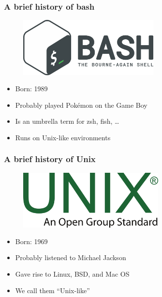 \documentclass[aspectratio=169]{beamer}
\begin{document}
\begin{frame}
  \frametitle{A brief history of bash}
  \begin{figure}[h]
    \centering
    \includegraphics[height=3cm]{./assets/bash_logo.png}
  \end{figure}
  \begin{itemize}
    \item Born: 1989
    \item Probably played Pokémon on the Game Boy
    \item Is an umbrella term for zsh, fish, …
    \item Runs on Unix-like environments
  \end{itemize}
\end{frame}

\begin{frame}
  \frametitle{A brief history of Unix}
  \begin{figure}[h]
    \centering
    \includegraphics[height=3cm]{./assets/unix_logo.png}
  \end{figure}
  \begin{itemize}
    \item Born: 1969
    \item Probably listened to Michael Jackson
    \item Gave rise to Linux, BSD, and Mac OS
    \item We call them ``Unix-like''
  \end{itemize}
\end{frame}
\end{document}
